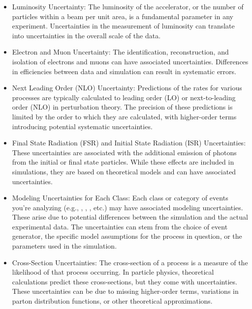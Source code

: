 \begin{itemize}

    \item Luminosity Uncertainty: The luminosity of the accelerator, or the number of particles within a beam per unit
          area, is a fundamental parameter in any experiment. Uncertainties in the measurement of luminosity can
          translate into uncertainties in the overall scale of the data.

    \item Electron and Muon Uncertainty: The identification, reconstruction, and isolation of electrons and muons can
          have associated uncertainties. Differences in efficiencies between data and simulation can result in
          systematic errors.

    \item Next Leading Order (NLO) Uncertainty: Predictions of the rates for various processes are typically calculated
          to leading order (LO) or next-to-leading order (NLO) in perturbation theory. The precision of these
          predictions is limited by the order to which they are calculated, with higher-order terms introducing
          potential systematic
          uncertainties.

    \item Final State Radiation (FSR) and Initial State Radiation (ISR) Uncertainties: These uncertainties are
          associated with the additional emission of photons from the initial or final state particles. While these
          effects are included in simulations, they are based on theoretical models and can have associated
          uncertainties.

    \item Modeling Uncertainties for Each Class: Each class or category of events you're analyzing (e.g., \tth,
          \ttw, \ttz, etc.) may have associated modeling uncertainties. These arise due to potential differences
          between the simulation and the actual experimental data. The uncertainties can stem from the choice of event
          generator, the specific model assumptions for the process in question, or the parameters used in the
          simulation.

    \item Cross-Section Uncertainties: The cross-section of a process is a measure of the likelihood of that process
          occurring. In particle physics, theoretical calculations predict these cross-sections, but they come with
          uncertainties. These uncertainties can be due to missing higher-order terms, variations in parton distribution
          functions, or other theoretical approximations.


\end{itemize}
